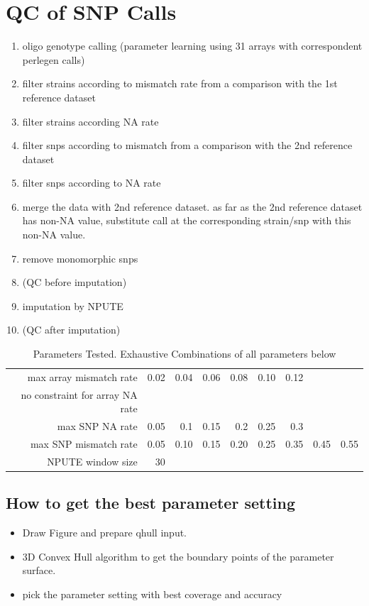 \documentclass[a4paper,10pt]{article}
\begin{document}
\section{QC of SNP Calls}
\begin{enumerate}
 \item oligo genotype calling (parameter learning using 31 arrays with correspondent perlegen calls)
 \item filter strains according to mismatch rate from a comparison with the 1st reference dataset
 \item filter strains according NA rate
 \item filter snps according to mismatch from a comparison with the 2nd reference dataset
 \item filter snps according to NA rate
 \item merge the data with 2nd reference dataset. as far as the 2nd reference dataset has non-NA value,  substitute call at the corresponding strain/snp with this non-NA value.
 \item remove monomorphic snps
 \item (QC before imputation)
 \item imputation by NPUTE
 \item (QC after imputation)
\end{enumerate}
\begin{table}
\caption{Parameters Tested. Exhaustive Combinations of all parameters below}
\begin{tabular}{|r|r|r|r|r|r|r|r|r|}
\hline
max array mismatch rate & 0.02 & 0.04 & 0.06 & 0.08 & 0.10 & 0.12 \\
no constraint for array NA rate & & & & & \\

max SNP NA rate & 0.05 & 0.1 & 0.15 & 0.2 & 0.25 & 0.3 \\

max SNP mismatch rate & 0.05 & 0.10 & 0.15 & 0.20 & 0.25 & 0.35 & 0.45 & 0.55 \\

NPUTE window size & 30 \\
\hline
\end{tabular}
\end{table}

\subsection{How to get the best parameter setting}
\begin{itemize}
 \item Draw Figure and prepare qhull input.
 \item 3D Convex Hull algorithm to get the boundary points of the parameter surface.
 \item pick the parameter setting with best coverage and accuracy
\end{itemize}
\end{document}
